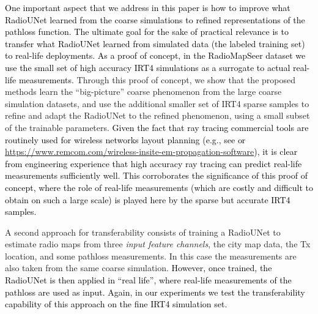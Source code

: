 \documentclass[10pt,a4paper]{article}
\begin{document}
\textcolor{black}{One important aspect that we address in this paper is how to improve what RadioUNet learned from the coarse simulations to refined representations of the pathloss function. The ultimate goal for the sake of practical relevance is to transfer what RadioUNet learned from simulated data (the labeled training set) 
to real-life deployments. As a proof of concept, in the RadioMapSeer dataset we use the small set of high 
accuracy IRT4 simulations as a surrogate to actual real-life measurements.} 
Through this proof of concept, we show that the proposed methods learn the ``big-picture'' coarse phenomenon 
from the large coarse simulation datasets, and use the additional smaller 
set of IRT4 sparse samples to refine and adapt the RadioUNet to the refined phenomenon, 
using a small subset of the trainable parameters.
%
\textcolor{black}{Given the fact that ray tracing commercial tools are routinely used for wireless networks layout planning (e.g., see \cite{WinPropFEKO} or \url{https://www.remcom.com/wireless-insite-em-propagation-software}),  it is clear from engineering experience that 
high accuracy ray tracing can predict real-life measurements sufficiently well.  
This corroborates the significance of this proof of concept, where the role of real-life measurements (which are costly and difficult to obtain on such a large scale) is played here by the sparse but accurate IRT4 samples.} 

A second approach for transferability consists of training a RadioUNet to estimate radio maps 
from three {\em input feature channels}, the city map data, the Tx location, and some pathloss measurements. 
In this case the measurements are also taken from the same coarse simulation. \textcolor{black}{However, once trained, 
the RadioUNet is then applied in ``real life'', where real-life measurements of the pathloss are used as input. Again, in our experiments we test the transferability capability of this approach 
on the fine IRT4 simulation set.}

\end{document}
